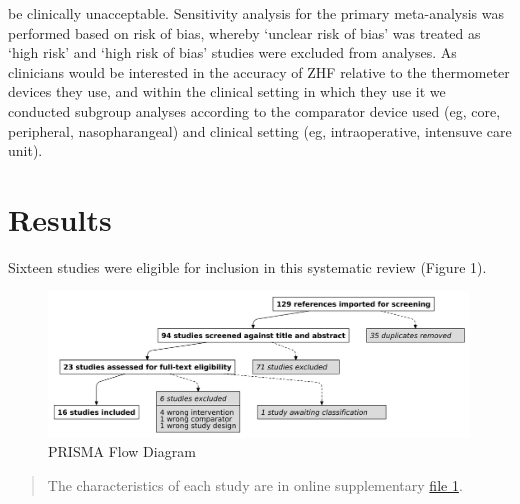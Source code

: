 \documentclass[smallextended]{svjour3}       %
\begin{document}
be clinically unacceptable. Sensitivity analysis for the primary
meta-analysis was performed based on risk of bias, whereby `unclear risk
of bias' was treated as `high risk' and `high risk of bias' studies were
excluded from analyses. As clinicians would be interested in the
accuracy of ZHF relative to the thermometer devices they use, and within
the clinical setting in which they use it we conducted subgroup analyses
according to the comparator device used (eg, core, peripheral,
nasopharangeal) and clinical setting (eg, intraoperative, intensuve care
unit).

\hypertarget{results}{%
\section{Results}\label{results}}

Sixteen studies were eligible for inclusion in this systematic review
(Figure 1).

\begin{figure}

{\centering \includegraphics[width=4.4in]{zhf_manuscript_files/figure-latex/unnamed-chunk-2-1} 

}

\caption{PRISMA Flow Diagram}\label{fig:unnamed-chunk-2}
\end{figure}

\begin{quote}
The characteristics of each study are in online supplementary
\href{link\%20to\%20file\%201}{file 1}.
\end{quote}
\end{document}
